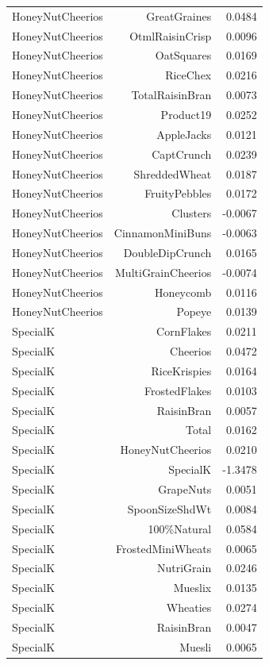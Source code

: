 \begin{longtable}{@{}lrr@{}}
HoneyNutCheerios & GreatGraines & 0.0484 \\
HoneyNutCheerios & OtmlRaisinCrisp & 0.0096 \\
HoneyNutCheerios & OatSquares & 0.0169 \\
HoneyNutCheerios & RiceChex & 0.0216 \\
HoneyNutCheerios & TotalRaisinBran & 0.0073 \\
HoneyNutCheerios & Product19 & 0.0252 \\
HoneyNutCheerios & AppleJacks & 0.0121 \\
HoneyNutCheerios & CaptCrunch & 0.0239 \\
HoneyNutCheerios & ShreddedWheat & 0.0187 \\
HoneyNutCheerios & FruityPebbles & 0.0172 \\
HoneyNutCheerios & Clusters & -0.0067 \\
HoneyNutCheerios & CinnamonMiniBuns & -0.0063 \\
HoneyNutCheerios & DoubleDipCrunch & 0.0165 \\
HoneyNutCheerios & MultiGrainCheerios & -0.0074 \\
HoneyNutCheerios & Honeycomb & 0.0116 \\
HoneyNutCheerios & Popeye & 0.0139 \\
SpecialK & CornFlakes & 0.0211 \\
SpecialK & Cheerios & 0.0472 \\
SpecialK & RiceKrispies & 0.0164 \\
SpecialK & FrostedFlakes & 0.0103 \\
SpecialK & RaisinBran & 0.0057 \\
SpecialK & Total & 0.0162 \\
SpecialK & HoneyNutCheerios & 0.0210 \\
SpecialK & SpecialK & -1.3478 \\
SpecialK & GrapeNuts & 0.0051 \\
SpecialK & SpoonSizeShdWt & 0.0084 \\
SpecialK & 100\%Natural & 0.0584 \\
SpecialK & FrostedMiniWheats & 0.0065 \\
SpecialK & NutriGrain & 0.0246 \\
SpecialK & Mueslix & 0.0135 \\
SpecialK & Wheaties & 0.0274 \\
SpecialK & RaisinBran & 0.0047 \\
SpecialK & Muesli & 0.0065 \\

\end{longtable}
